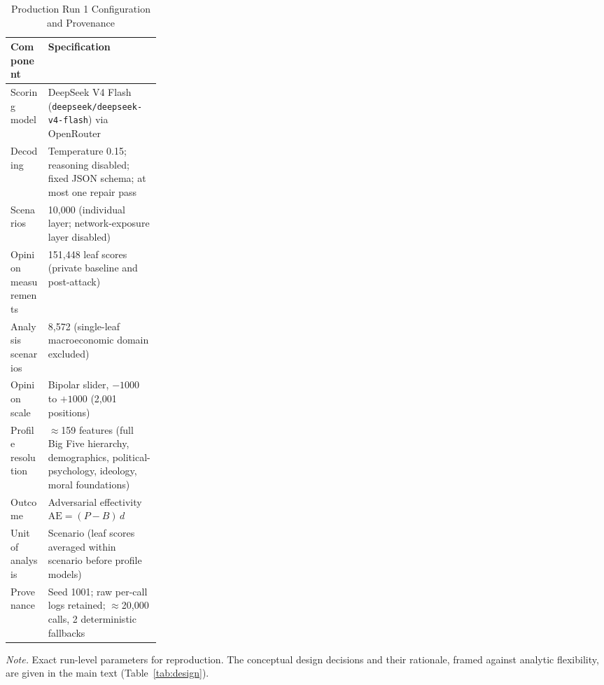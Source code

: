 \documentclass[11pt,a4paper]{article}
\newcommand{\floatleft}{\setlength{\parindent}{0pt}\RaggedRight}
\newcommand{\apanote}[1]{\par\vspace{3pt}\begingroup\footnotesize\setstretch{1.06}%
  \textit{Note.} #1\par\endgroup}
\begin{document}
\clearpage

\begin{table}[H]
\floatleft
\caption{Production Run 1 Configuration and Provenance}
\label{tab:s4config}
\vspace{2pt}
\begingroup\small
\begin{tabularx}{\linewidth}{@{}p{0.25\linewidth}Y@{}}
\toprule
Component & Specification \\
\midrule
Scoring model & DeepSeek V4 Flash (\texttt{deepseek/deepseek-v4-flash}) via OpenRouter \\
Decoding & Temperature 0.15; reasoning disabled; fixed JSON schema; at most one repair pass \\
Scenarios & 10,000 (individual layer; network-exposure layer disabled) \\
Opinion measurements & 151,448 leaf scores (private baseline and post-attack) \\
Analysis scenarios & 8,572 (single-leaf macroeconomic domain excluded) \\
Opinion scale & Bipolar slider, $-1000$ to $+1000$ (2,001 positions) \\
Profile resolution & $\approx$159 features (full Big Five hierarchy, demographics,
political-psychology, ideology, moral foundations) \\
Outcome & Adversarial effectivity $\mathrm{AE} = (P-B)\,d$ \\
Unit of analysis & Scenario (leaf scores averaged within scenario before profile models) \\
Provenance & Seed 1001; raw per-call logs retained; $\approx$20,000 calls, 2 deterministic
fallbacks \\
\bottomrule
\end{tabularx}
\endgroup
\apanote{Exact run-level parameters for reproduction. The conceptual design decisions and their
rationale, framed against analytic flexibility, are given in the main text
(Table~\ref{tab:design}).}
\end{table}

\clearpage
\end{document}
